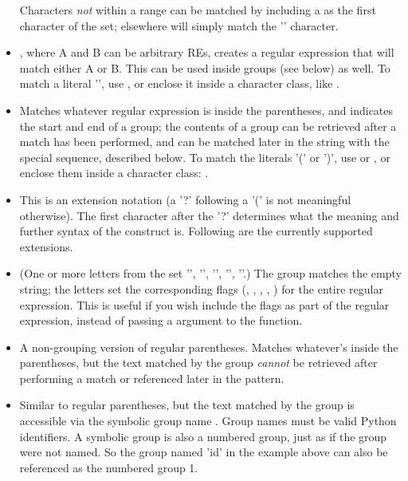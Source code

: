 \begin{itemize}
Characters \emph{not} within a range can be matched by including a
\code{\^} as the first character of the set; \code{\^} elsewhere will
simply match the '\code{\^}' character.  
%
\item[\code{|}], where A and B can be arbitrary REs,
creates a regular expression that will match either A or B.  This can
be used inside groups (see below) as well.  To match a literal '\code{|}',
use \code{\e|}, or enclose it inside a character class, like \code{[|]}.
%
\item[\code{(...)}] Matches whatever regular expression is inside the
parentheses, and indicates the start and end of a group; the contents
of a group can be retrieved after a match has been performed, and can
be matched later in the string with the  special
sequence, described below.  To match the literals '(' or ')', 
use \code{\e(} or \code{\e)}, or enclose them inside a character
class: \code{[(] [)]}.
%
\item[\code{(?...)}] This is an extension notation (a '?' following a
'(' is not meaningful otherwise).  The first character after the '?'
determines what the meaning and further syntax of the construct is.
Following are the currently supported extensions.
%
\item[\code{(?iLmsx)}] (One or more letters from the set '',
'', '', '', ''.)  The group matches
the empty string; the letters set the corresponding flags
(, , , , ) for
the entire regular expression.  This is useful if you wish include the
flags as part of the regular expression, instead of passing a
 argument to the  function. 
%
\item[\code{(?:...)}] A non-grouping version of regular parentheses.
Matches whatever's inside the parentheses, but the text matched by the
group \emph{cannot} be retrieved after performing a match or
referenced later in the pattern. 
%
\item[\code{(?P<\var{name}>...)}] Similar to regular parentheses, but
the text matched by the group is accessible via the symbolic group
name .  Group names must be valid Python identifiers.  A
symbolic group is also a numbered group, just as if the group were not
named.  So the group named 'id' in the example above can also be
referenced as the numbered group 1.


\end{itemize}

